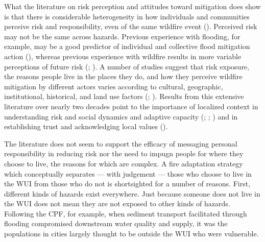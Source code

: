 \documentclass[
]{article}
\begin{document}
What the literature on risk perception and attitudes toward mitigation does show is that there is considerable heterogeneity in how individuals and communities perceive risk and responsibility, even of the same wildfire event (). Perceived risk may not be the same across hazards. Previous experience with flooding, for example, may be a good predictor of individual and collective flood mitigation action (), whereas previous experience with wildfire results in more variable perceptions of future risk (; ). A number of studies suggest that risk exposure, the reasons people live in the places they do, and how they perceive wildfire mitigation by different actors varies according to cultural, geographic, institutional, historical, and land use factors (; ). Results from this extensive literature over nearly two decades point to the importance of localized context in understanding risk and social dynamics and adaptive capacity (; ; ) and in establishing trust and acknowledging local values ().

The literature does not seem to support the efficacy of messaging personal responsibility in reducing risk nor the need to impugn people for where they choose to live, the reasons for which are complex. A fire adaptation strategy which conceptually separates --- with judgement --- those who choose to live in the WUI from those who do not is shortsighted for a number of reasons. First, different kinds of hazards exist everywhere. Just because someone does not live in the WUI does not mean they are not exposed to other kinds of hazards. Following the CPF, for example, when sediment transport facilitated through flooding compromised downstream water quality and supply, it was the populations in cities largely thought to be outside the WUI who were vulnerable.
\end{document}
